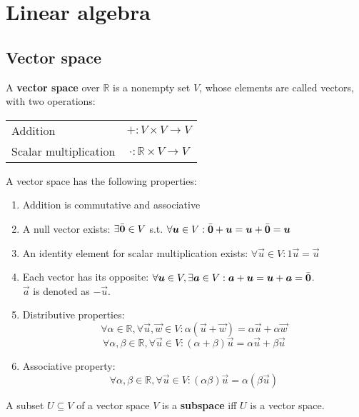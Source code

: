 \chapter{Linear algebra}


\section{Vector space}

A \textbf{vector space} over $\mathbb{R}$ is a nonempty set $V$, whose elements are called vectors, with two operations: 
\begin{center}
    \begin{tabular}{l c}
        Addition & $+ : V \times V \rightarrow V$ \\
        Scalar multiplication & $\cdot : \mathbb{R} \times V \rightarrow V$
    \end{tabular}
\end{center}
A vector space has the following properties:
\begin{enumerate}
    \item Addition is commutative and associative
    \item A null vector exists: $\exists \bar{{\bm{0}}} \in V$ s.t. $\forall {\bm{u}} \in V: \bar{{\bm{0}}} + {\bm{u}} = {\bm{u}} + \bar{{\bm{0}}} = {\bm{u}}$
    \item An identity element for scalar multiplication exists: $\forall \vec{u} \in V: 1\vec{u} = \vec{u}$
    \item Each vector has its opposite: $\forall {\bm{u}} \in V, \exists {\bm{a}} \in V: {\bm{a}} + {\bm{u}} = {\bm{u}} + {\bm{a}} = \bar{{\bm{0}}}$.\\
        $\vec{a}$ is denoted as $-\vec{u}$.
    \item Distributive properties:
        \[ \forall \alpha \in \mathbb{R}, \forall \vec{u}, \vec{w} \in V: \alpha(\vec{u} + \vec{w}) = \alpha \vec{u} + \alpha \vec{w} \]
        \[ \forall \alpha, \beta \in \mathbb{R}, \forall \vec{u} \in V: (\alpha + \beta)\vec{u} = \alpha \vec{u} + \beta \vec{u} \]
    \item Associative property:
        \[ \forall \alpha, \beta \in \mathbb{R}, \forall \vec{u} \in V: (\alpha \beta)\vec{u} = \alpha (\beta \vec{u}) \]
\end{enumerate}
%
A subset $U \subseteq V$ of a vector space $V$ is a \textbf{subspace} iff $U$ is a vector space.


